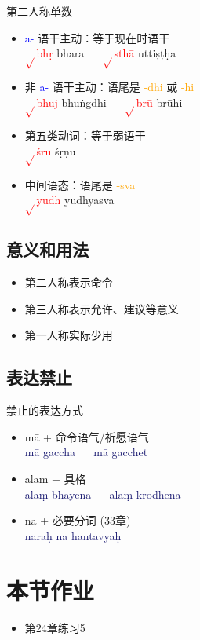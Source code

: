 \documentclass[17pt]{beamer}
\newcommand{\verbroot}[1]{\textcolor{red}{$\sqrt{}$#1}}
\newcommand{\verbstem}[1]{\textcolor{blue}{#1\nobreakdash-}}
\newcommand{\wordending}[1]{\textcolor{Orange}{\nobreakdash-#1}}
\newcommand{\fullpada}[1]{\textcolor{OliveGreen}{#1}}
\newcommand{\fullsentence}[1]{\textcolor{MidnightBlue}{#1}}
\begin{document}
\begin{frame}{第二人称单数}
  \begin{itemize}
    \item \verbstem{a} 语干主动：等于现在时语干\\
    \verbroot{bhṛ}  \fullpada{bhara}  ~~ \verbroot{sthā}  \fullpada{uttiṣṭḥa}
    \item 非 \verbstem{a} 语干主动：语尾是 \wordending{dhi} 或 \wordending{hi}\\
    \verbroot{bhuj}  \fullpada{bhuṅgdhi}  ~~ \verbroot{brū}  \fullpada{brūhi}
    \item 第五类动词：等于弱语干\\
    \verbroot{śru}  \fullpada{śṛṇu}  
    \item 中间语态：语尾是 \wordending{sva}\\
    \verbroot{yudh}  \fullpada{yudhyasva}  
  \end{itemize}
\end{frame}

\subsection{意义和用法}
\begin{frame}{\insertsubsection }
  \begin{itemize}
    \item 第二人称表示命令
    \item 第三人称表示允许、建议等意义
    \item 第一人称实际少用
  \end{itemize}
\end{frame}

\subsection{表达禁止}
\begin{frame}{禁止的表达方式}
  \begin{itemize}
    \item mā + 命令语气/祈愿语气\\
    \fullsentence{mā gaccha} ~~ \fullsentence{mā gacchet}
    \item alam + 具格\\
    \fullsentence{alaṃ bhayena} ~~ \fullsentence{alaṃ krodhena}
    \item na + 必要分词 (33章) \\
    \fullsentence{naraḥ na hantavyaḥ}   
  \end{itemize}
\end{frame}

\section{本节作业}

\begin{frame}{\insertsection }
  \begin{itemize}
    \item
      第24章练习5
  \end{itemize}
\end{frame}  
\end{document}
